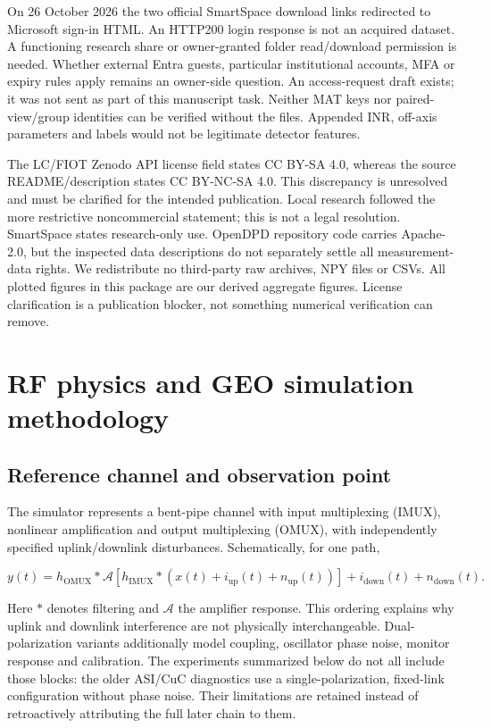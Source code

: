\documentclass[
  10pt,
]{article}
\begin{document}
On 26 October 2026 the two official SmartSpace download links redirected
to Microsoft sign-in HTML. An HTTP200 login response is not an acquired
dataset. A functioning research share or owner-granted folder
read/download permission is needed. Whether external Entra guests,
particular institutional accounts, MFA or expiry rules apply remains an
owner-side question. An access-request draft exists; it was not sent as
part of this manuscript task. Neither MAT keys nor paired-view/group
identities can be verified without the files. Appended INR, off-axis
parameters and labels would not be legitimate detector features.

The LC/FIOT Zenodo API license field states CC BY-SA 4.0, whereas the
source README/description states CC BY-NC-SA 4.0. This discrepancy is
unresolved and must be clarified for the intended publication. Local
research followed the more restrictive noncommercial statement; this is
not a legal resolution. SmartSpace states research-only use. OpenDPD
repository code carries Apache-2.0, but the inspected data descriptions
do not separately settle all measurement-data rights. We redistribute no
third-party raw archives, NPY files or CSVs. All plotted figures in this
package are our derived aggregate figures. License clarification is a
publication blocker, not something numerical verification can remove.

\section{RF physics and GEO simulation
methodology}\label{rf-physics-and-geo-simulation-methodology}

\subsection{Reference channel and observation
point}\label{reference-channel-and-observation-point}

The simulator represents a bent-pipe channel with input multiplexing
(IMUX), nonlinear amplification and output multiplexing (OMUX), with
independently specified uplink/downlink disturbances. Schematically, for
one path,

\[
y(t)=h_{\mathrm{OMUX}}*\mathcal{A}\!\left[h_{\mathrm{IMUX}}*(x(t)+i_{\mathrm{up}}(t)+n_{\mathrm{up}}(t))\right]+i_{\mathrm{down}}(t)+n_{\mathrm{down}}(t).
\]

Here \(*\) denotes filtering and \(\mathcal{A}\) the amplifier response.
This ordering explains why uplink and downlink interference are not
physically interchangeable. Dual-polarization variants additionally
model coupling, oscillator phase noise, monitor response and
calibration. The experiments summarized below do not all include those
blocks: the older ASI/CuC diagnostics use a single-polarization,
fixed-link configuration without phase noise. Their limitations are
retained instead of retroactively attributing the full later chain to
them.
\end{document}
